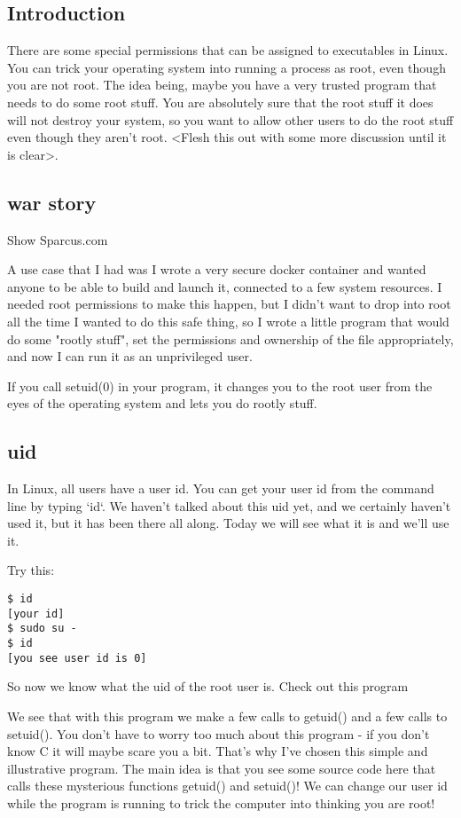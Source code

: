\documentclass[12pt]{article}
\begin{document}
\subsection{Introduction}
There are some special permissions that can be assigned to executables in Linux. You can trick your operating system into running a process as root, even though you are not root. The idea being, maybe you have a very trusted program that needs to do some root stuff. You are absolutely sure that the root stuff it does will not destroy your system, so you want to allow other users to do the root stuff even though they aren't root. <Flesh this out with some more discussion until it is clear>. 
  
\subsection{war story}
Show Sparcus.com

A use case that I had was I wrote a very secure docker container and wanted anyone to be able to build and launch it, connected to a few system resources. I needed root permissions to make this happen, but I didn't want to drop into root all the time I wanted to do this safe thing, so I wrote a little program that would do some "rootly stuff", set the permissions and ownership of the file appropriately, and now I can run it as an unprivileged user.

If you call setuid(0) in your program, it changes you to the root user from the eyes of the operating system and lets you do rootly stuff.

\subsection{uid}
In Linux, all users have a user id. You can get your user id from the command line by typing `id`. We haven't talked about this uid yet, and we certainly haven't used it, but it has been there all along. Today we will see what it is and we'll use it.

Try this:
\begin{lstlisting}
$ id
[your id]
$ sudo su -
$ id
[you see user id is 0]
\end{lstlisting}

So now we know what the uid of the root user is. Check out this program




We see that with this program we make a few calls to getuid() and a few calls to setuid(). You don't have to worry too much about this program - if you don't know C it will maybe scare you a bit. That's why I've chosen this simple and illustrative program.  The main idea is that you see some source code here that calls these mysterious functions getuid() and setuid()! We can change our user id while the program is running to trick the computer into thinking you are root!
\end{document}
